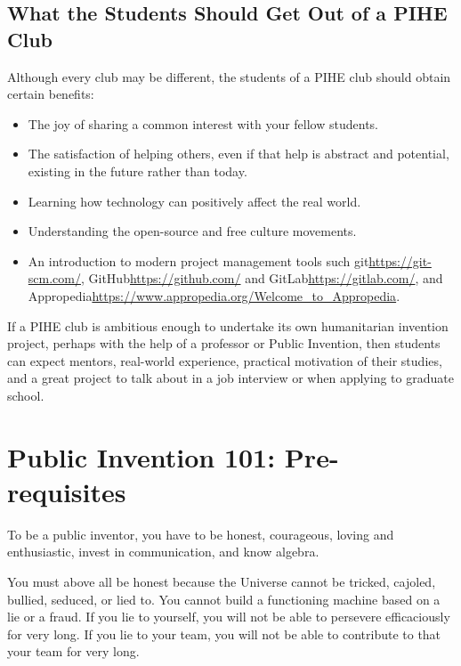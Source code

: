 \documentclass[
	fontsize=10pt, %
	twoside=false, %
	secnumdepth=1, %
]{kaobook}
\begin{document}
\section{What the Students Should Get Out of a PIHE Club}

Although every club may be different, the students of a PIHE club should obtain certain benefits:
\begin{itemize}
\item The joy of sharing a common interest with your fellow students.
\item The satisfaction of helping others, even if that help is abstract and potential, existing in the future rather than today.
\item Learning how technology can positively affect the real world.
\item Understanding the open-source and free culture movements.
\item An introduction to modern project management tools such git\url{https://git-scm.com/}, GitHub\url{https://github.com/} and GitLab\url{https://gitlab.com/}, and Appropedia\url{https://www.appropedia.org/Welcome_to_Appropedia}.
\end{itemize}

If a PIHE club is ambitious enough to undertake its own humanitarian
invention project, perhaps with the help of a professor or Public
Invention, then students can expect mentors, real-world experience,
practical motivation of their studies, and a great project to talk
about in a job interview or when applying to graduate school.



\chapter{Public Invention 101: Pre-requisites}

To be a public inventor, you have to be honest,
courageous, loving and enthusiastic, invest in communication, and know algebra.

You must above all be honest because the
Universe cannot be tricked, cajoled, bullied,
seduced, or lied to.
You cannot build a functioning machine based on a
lie or a fraud.
If you lie to yourself, you will not be able
to persevere efficaciously for very long.
If you lie to your team, you will not be able
to contribute to that your team for very long.
\end{document}
